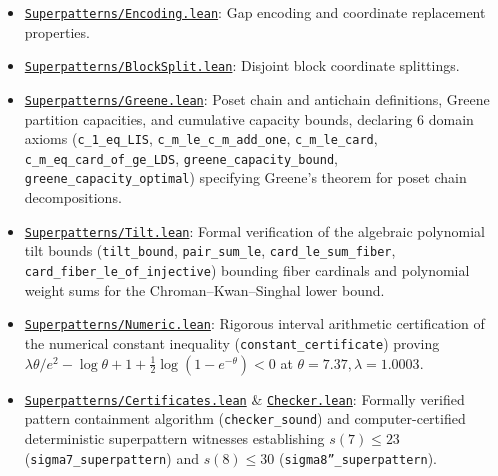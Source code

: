 \documentclass[
  11pt,
]{article}
\begin{document}
\begin{itemize}
  simultaneous failure by
  \(\Pr(\neg\text{IsSuperpattern}) \le k! \cdot (M^2 P_{\mathrm{macro}} + M^2 d P_{\mathrm{chain}} + M d P_{\mathrm{track}}) \le k^k \exp(-c(\varepsilon) k^2) \to 0\).
\item
  \href{https://github.com/adamhadani/superpatterns/blob/main/formal-verification/lean/Superpatterns/Encoding.lean}{\texttt{Superpatterns/Encoding.lean}}:
  Gap encoding and coordinate replacement properties.
\item
  \href{https://github.com/adamhadani/superpatterns/blob/main/formal-verification/lean/Superpatterns/BlockSplit.lean}{\texttt{Superpatterns/BlockSplit.lean}}:
  Disjoint block coordinate splittings.
\item
  \href{https://github.com/adamhadani/superpatterns/blob/main/formal-verification/lean/Superpatterns/Greene.lean}{\texttt{Superpatterns/Greene.lean}}:
  Poset chain and antichain definitions, Greene partition capacities, and
  cumulative capacity bounds, declaring 6 domain axioms
  (\texttt{c\_1\_eq\_LIS}, \texttt{c\_m\_le\_c\_m\_add\_one},
  \texttt{c\_m\_le\_card}, \texttt{c\_m\_eq\_card\_of\_ge\_LDS},
  \texttt{greene\_capacity\_bound}, \texttt{greene\_capacity\_optimal})
  specifying Greene's theorem for poset chain decompositions.
\item
  \href{https://github.com/adamhadani/superpatterns/blob/main/formal-verification/lean/Superpatterns/Tilt.lean}{\texttt{Superpatterns/Tilt.lean}}:
  Formal verification of the algebraic polynomial tilt bounds (\texttt{tilt\_bound}, \texttt{pair\_sum\_le}, \texttt{card\_le\_sum\_fiber}, \texttt{card\_fiber\_le\_of\_injective}) bounding fiber cardinals and polynomial weight sums for the Chroman--Kwan--Singhal lower bound.
\item
  \href{https://github.com/adamhadani/superpatterns/blob/main/formal-verification/lean/Superpatterns/Numeric.lean}{\texttt{Superpatterns/Numeric.lean}}:
  Rigorous interval arithmetic certification of the numerical constant inequality (\texttt{constant\_certificate}) proving \(\lambda\theta/e^2 - \log\theta + 1 + \frac{1}{2}\log(1-e^{-\theta}) < 0\) at \(\theta = 7.37, \lambda = 1.0003\).
\item
  \href{https://github.com/adamhadani/superpatterns/blob/main/formal-verification/lean/Superpatterns/Certificates.lean}{\texttt{Superpatterns/Certificates.lean}} \& \href{https://github.com/adamhadani/superpatterns/blob/main/formal-verification/lean/Superpatterns/Checker.lean}{\texttt{Checker.lean}}:
  Formally verified pattern containment algorithm (\texttt{checker\_sound}) and computer-certified deterministic superpattern witnesses establishing \(s(7) \le 23\) (\texttt{sigma7\_superpattern}) and \(s(8) \le 30\) (\texttt{sigma8''\_superpattern}).

\end{itemize}
\end{document}
